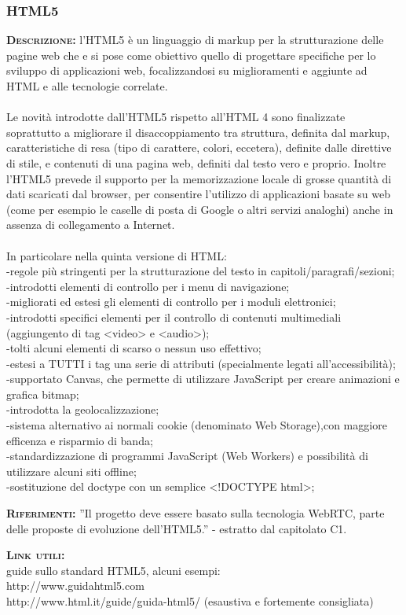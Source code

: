\subsubsection{HTML5}
\begin{description}
	\item{\scshape\bfseries Descrizione:} l'HTML5 è un linguaggio di markup per la strutturazione delle pagine web che e si pose come obiettivo quello di progettare specifiche per lo sviluppo di applicazioni web, focalizzandosi su miglioramenti e aggiunte ad HTML e alle tecnologie correlate.\\\\
Le novità introdotte dall'HTML5 rispetto all'HTML 4 sono finalizzate soprattutto a migliorare il disaccoppiamento tra struttura, definita dal markup, caratteristiche di resa (tipo di carattere, colori, eccetera), definite dalle direttive di stile, e contenuti di una pagina web, definiti dal testo vero e proprio. Inoltre l'HTML5 prevede il supporto per la memorizzazione locale di grosse quantità di dati scaricati dal browser, per consentire l'utilizzo di applicazioni basate su web (come per esempio le caselle di posta di Google o altri servizi analoghi) anche in assenza di collegamento a Internet.\\\\
In particolare nella quinta versione di HTML:\\
-regole più stringenti per la strutturazione del testo in capitoli/paragrafi/sezioni;\\
-introdotti elementi di controllo per i menu di navigazione;\\
-migliorati ed estesi gli elementi di controllo per i moduli elettronici;\\
-introdotti specifici elementi per il controllo di contenuti multimediali (aggiungento di tag <video> e <audio>);\\
-tolti alcuni elementi di scarso o nessun uso effettivo;\\
-estesi a TUTTI i tag una serie di attributi (specialmente legati all'accessibilità);\\
-supportato Canvas, che permette di utilizzare JavaScript per creare animazioni e grafica bitmap;\\
-introdotta la geolocalizzazione;\\
-sistema alternativo ai normali cookie (denominato Web Storage),con maggiore efficenza e risparmio di banda;\\
-standardizzazione di programmi JavaScript (Web Workers) e possibilità di utilizzare alcuni siti offline;\\
-sostituzione del doctype con un semplice <!DOCTYPE html>;
	\item{\scshape\bfseries Riferimenti:} ''Il progetto deve essere basato sulla tecnologia WebRTC, parte delle proposte di evoluzione dell'HTML5.'' - estratto dal capitolato C1.
	\item{\scshape\bfseries Link utili:} \\guide sullo standard HTML5, alcuni esempi:\\
http://www.guidahtml5.com\\
http://www.html.it/guide/guida-html5/ (esaustiva e fortemente consigliata)
\end{description}

